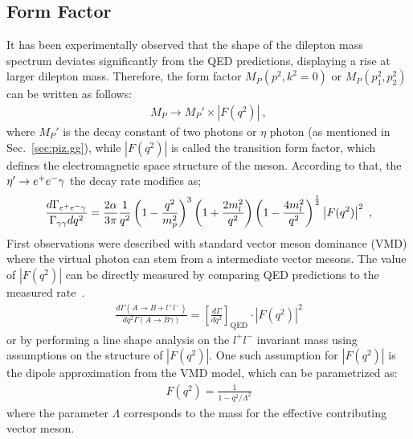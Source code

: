  \subsection{Form Factor}
   It has been experimentally observed that the shape of the dilepton mass spectrum deviates significantly from the QED predictions, displaying a rise at larger dilepton mass. Therefore, the form factor ${M}_P(p^2,k^2=0)$ or ${M}_P(p_{1}^2,p_{2}^2)$  can be written as follows:
  \begin{align}
  {M}_P \to {M}_P' \times \left|F(q^2)\right| \ ,
  \end{align}
  where $M_P'$ is the decay constant of two photons or $\eta$ photon (as mentioned in Sec.~\ref{sec:piz.gg}), while $\left|F(q^2)\right|$ is called the transition form factor, which defines the electromagnetic space structure of the meson. According to that, the $\eta^{\prime} \to e^+e^- \gamma$ the decay rate modifies as;
  \begin{align}\label{eq:eegff.final}
  \frac{d\Gamma_{e^+e^- \gamma}}{\Gamma_{\gamma\gamma} dq^2} = \frac{2 \alpha}{3 \pi} \frac{1}{q^2} \left( 1- \frac{q^2}{m_p^2}\right)^3 \left( 1+ \frac{2m_l^2}{q^2}\right) \left( 1- \frac{4m_l^2}{q^2}\right)^{\frac{1}{2}} \left|F(q^2)\right|^2 \ ,
  \end{align}
  First observations were described with standard vector meson dominance (VMD) where the virtual photon can stem from a intermediate vector mesons. 
  The value of $\left|F(q^2)\right|$ can be directly measured by comparing QED predictions to the measured rate~\cite{landsberg}. 
  \begin{align}
  \frac{d\Gamma(A\to B+l^+l^-)}{dq^2 \Gamma(A\to B\gamma)} = \left[\frac{d\Gamma}{dq^2}\right]_{\text{QED}} \cdot \left | F(q^2) \right |^2 
  \end{align}
  or by performing a line shape analysis on the $l^{+}l^{-}$ invariant mass using assumptions on the structure of $\left|F(q^2)\right|$. One such assumption for $\left|F(q^2)\right|$ is the dipole approximation from the VMD model, which can be parametrized as:
  \begin{align}
  F(q^2) = \frac{1}{1-q^2/\Lambda^2} 
  \end{align}
   where the parameter $\Lambda$ corresponds to the mass for the effective contributing vector meson.

